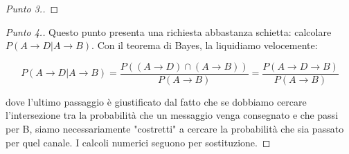 \documentclass{beamer}
\begin{document}
\begin{frame}
\begin{proof}[Punto 3.]
	\end{proof}
\end{frame}
\renewcommand\qedsymbol{$\blacksquare$}


\begin{frame}
	\begin{proof}[Punto 4.]
		Questo punto presenta una richiesta abbastanza schietta: calcolare $P(A \rightarrow D|A \rightarrow B)$. Con il teorema di Bayes, la liquidiamo velocemente:

		\[
			P(A \rightarrow D|A \rightarrow B) = \frac{P((A \rightarrow D) \cap (A \rightarrow B))}{P(A \rightarrow B)} = \frac{P(A \rightarrow D \rightarrow B)}{P(A \rightarrow B)}
		\]

		dove l'ultimo passaggio è giustificato dal fatto che se dobbiamo cercare l'intersezione tra la probabilità che un messaggio venga consegnato e che passi per B, siamo necessariamente "costretti" a cercare la probabilità che sia passato per quel canale. I calcoli numerici seguono per sostituzione. \qedhere
	\end{proof}
\end{frame}
\end{document}
